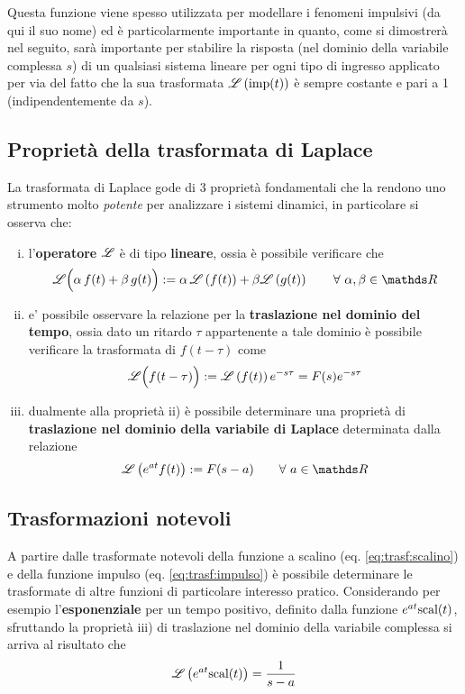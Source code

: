 	Questa funzione viene spesso utilizzata per modellare i fenomeni impulsivi (da qui il suo nome) ed è particolarmente importante in quanto, come si dimostrerà nel seguito, sarà importante per stabilire la risposta (nel dominio della variabile complessa $s$) di un qualsiasi sistema lineare per ogni tipo di ingresso applicato per via del fatto che la sua trasformata $\mathscr L \left( \textrm{imp}(t) \right)$ è sempre costante e pari a 1 (indipendentemente da $s$).
	
	
	\subsection{Proprietà della trasformata di Laplace}
	    La trasformata di Laplace gode di 3 proprietà fondamentali che la rendono uno strumento molto \textit{potente} per analizzare i sistemi dinamici, in particolare si osserva che:
	    \begin{enumerate}[i)]
	        \item l'\textbf{operatore} $\mathscr L$ è di tipo \textbf{lineare}, ossia è possibile verificare che
	        \begin{equation}
	            \L\Big( \alpha\, f(t) + \beta\, g(t)\Big) := \alpha\, \trasf{f(t)} + \beta \trasf{g(t)} \qquad \forall \ \alpha,\beta\in\mathds R 
	        \end{equation}
	        
	        \item e' possibile osservare la relazione per la \textbf{traslazione nel dominio del tempo}, ossia dato un ritardo $\tau$ appartenente a tale dominio è possibile verificare la trasformata di $f(t-\tau)$ come
	        \begin{equation}
	            \mathscr L \Big( f(t-\tau)\Big) := \mathscr L \left( f(t) \right) e^{-s\tau} = F(s) e^{-s\tau} 
	        \end{equation}
	        
	        \item dualmente alla proprietà ii) è possibile determinare una proprietà di \textbf{traslazione nel dominio della variabile di Laplace} determinata dalla relazione
	        \begin{equation}
	            \trasf{e^{at} f(t) } := F(s-a) \qquad \forall \ a \in \mathds R
	        \end{equation}
	        
	    \end{enumerate}
	
	\subsection{Trasformazioni notevoli}
	    A partire dalle trasformate notevoli della funzione a scalino (eq. \ref{eq:trasf:scalino}) e della funzione impulso (eq. \ref{eq:trasf:impulso}) è possibile determinare le trasformate di altre funzioni di particolare interesso pratico. Considerando per esempio l'\textbf{esponenziale} per un tempo positivo, definito dalla funzione $e^{at}\textrm{scal}(t)$, sfruttando la proprietà iii) di traslazione nel dominio della variabile complessa si arriva al risultato che
	    \begin{equation}
	        \mathscr L \left( e^{at} \textrm{scal}(t) \right) = \frac 1 {s-a}
	    \end{equation}
	    
